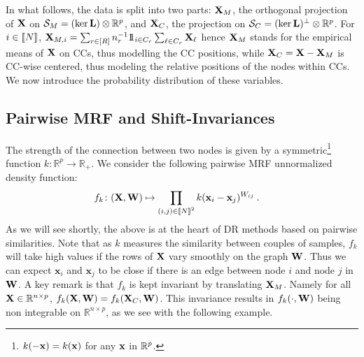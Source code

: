 In what follows, the data is split into two parts: $\mathbf{X}_{M}$, the orthogonal projection of $\mathbf{X}$ on $\mathcal{S}_{M} = (\ker \mathbf{L}) \otimes \mathbb{R}^p$, and $\mathbf{X}_{C}$, the projection on $\mathcal{S}_{C} = (\ker \mathbf{L})^{\perp} \otimes \mathbb{R}^p$. For $i \in {[\![N]\!]}$, $\mathbf{X}_{M,i} = \sum_{r \in [R]} n_r^{-1} 1\!\!1_{i \in C_r}\sum_{\ell \in C_r} \mathbf{X}_{\ell} $ hence $\mathbf{X}_{M}$ stands for the empirical means of $\mathbf{X}$ on CCs, thus modelling the CC positions, while $\mathbf{X}_{C} = \mathbf{X} - \mathbf{X}_{M}$ is CC-wise centered, thus modeling the relative positions of the nodes within CCs. We now introduce the probability distribution of these variables.

\subsection{Pairwise MRF and Shift-Invariances}\label{sec:within_CC}

The strength of the connection between two nodes is given by a symmetric\footnote{\ie $k(-{\mathbf{x}}) = k({\mathbf{x}})$ for any ${\mathbf{x}}$ in $\mathbb{R}^p$.} function $k: \mathbb{R}^p \to \mathbb{R}_+$. We consider the following pairwise MRF unnormalized density function:
\begin{align}\label{eq:unnormalized_MRF}
  f_{k} \colon (\mathbf{X},{\mathbf{W}}) &\mapsto \prod_{(i,j) \in {[\![N]\!]}^2} k(\mathbf{x}_{i} - \mathbf{x}_{j})^{W_{ij}} \: .
\end{align}
As we will see shortly, the above is at the heart of DR methods based on pairwise similarities. Note that as $k$ measures the similarity between couples of samples, $f_k$ will take high values if the rows of $\mathbf{X}$ vary smoothly on the graph ${\mathbf{W}}$. Thus we can expect $\mathbf{x}_i$ and $\mathbf{x}_j$ to be close if there is an edge between node $i$ and node $j$ in ${\mathbf{W}}$. A key remark is that $f_{k}$ is kept invariant by translating $\mathbf{X}_{M}$. Namely for all $\mathbf{X} \in \mathbb{R}^{n \times p}$, $f_{k}(\mathbf{X}, {\mathbf{W}}) = f_{k}(\mathbf{X}_{C}, {\mathbf{W}})$. This invariance results in $f_{k}(\cdot, {\mathbf{W}})$ being non integrable on $\mathbb{R}^{n \times p}$, as we see with the following example. 


